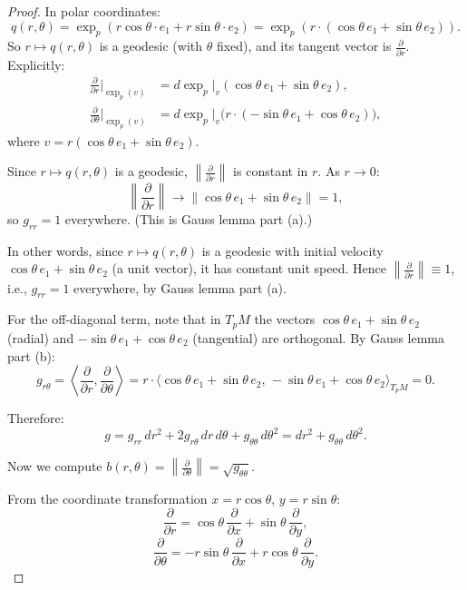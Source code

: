 \begin{proof}
In polar coordinates:
\[
q(r, \theta) = \exp_p(r \cos \theta \cdot e_1 + r \sin \theta \cdot e_2) = \exp_p(r \cdot (\cos \theta \, e_1 + \sin \theta \, e_2)).
\]
So $r \mapsto q(r, \theta)$ is a geodesic (with $\theta$ fixed), and its tangent vector is $\frac{\partial}{\partial r}$. Explicitly:
\begin{align*}
    \frac{\partial}{\partial r}\bigg|_{\exp_p(v)} &= d\exp_p\big|_v (\cos \theta \, e_1 + \sin \theta \, e_2),\\
\frac{\partial}{\partial \theta}\bigg|_{\exp_p(v)} &= d\exp_p\big|_v \big(r \cdot (-\sin \theta \, e_1 + \cos \theta \, e_2)\big),
\end{align*}
where $v = r(\cos\theta \, e_1 + \sin\theta \, e_2)$.

Since $r \mapsto q(r,\theta)$ is a geodesic, $\left\| \frac{\partial}{\partial r} \right\|$ is constant in $r$. As $r \to 0$:
\[
\left\| \frac{\partial}{\partial r} \right\| \to \| \cos \theta \, e_1 + \sin \theta \, e_2 \| = 1,
\]
so $g_{rr} = 1$ everywhere. (This is Gauss lemma part (a).)

In other words, since $r \mapsto q(r,\theta)$ is a geodesic with initial velocity $\cos\theta \, e_1 + \sin\theta \, e_2$ (a unit vector), it has constant unit speed. Hence $\left\|\frac{\partial}{\partial r}\right\| \equiv 1$, i.e., $g_{rr} = 1$ everywhere, by Gauss lemma part (a).

For the off-diagonal term, note that in $T_pM$ the vectors $\cos\theta \, e_1 + \sin\theta \, e_2$ (radial) and $-\sin\theta \, e_1 + \cos\theta \, e_2$ (tangential) are orthogonal. By Gauss lemma part (b):
\[
g_{r\theta} = \left\langle \frac{\partial}{\partial r}, \frac{\partial}{\partial \theta} \right\rangle = r \cdot \langle \cos\theta \, e_1 + \sin\theta \, e_2, \, -\sin\theta \, e_1 + \cos\theta \, e_2 \rangle_{T_pM} = 0.
\]

Therefore:
\[
g = g_{rr} \, dr^2 + 2 g_{r\theta} \, dr \, d\theta + g_{\theta\theta} \, d\theta^2 = dr^2 + g_{\theta\theta} \, d\theta^2.
\]

Now we compute $b(r, \theta) = \left\| \frac{\partial}{\partial \theta} \right\| = \sqrt{g_{\theta\theta}}$.

From the coordinate transformation $x = r \cos \theta$, $y = r \sin \theta$:
\[
\frac{\partial}{\partial r} = \cos \theta \, \frac{\partial}{\partial x} + \sin \theta \, \frac{\partial}{\partial y},
\]
\[
\frac{\partial}{\partial \theta} = -r \sin \theta \, \frac{\partial}{\partial x} + r \cos \theta \, \frac{\partial}{\partial y}.
\]


\end{proof}
